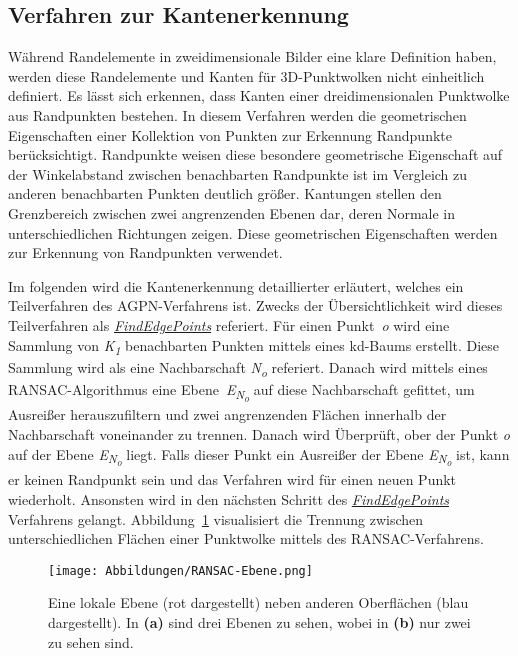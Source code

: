 \subsection{Verfahren zur Kantenerkennung} \label{edge_detection_reprod}
Während Randelemente in zweidimensionale Bilder eine klare Definition haben, werden diese Randelemente und Kanten für 3D-Punktwolken nicht einheitlich definiert. Es lässt sich erkennen, dass Kanten einer dreidimensionalen Punktwolke aus Randpunkten bestehen. In diesem Verfahren werden die geometrischen Eigenschaften einer Kollektion von Punkten zur Erkennung Randpunkte berücksichtigt. Randpunkte weisen diese besondere geometrische Eigenschaft auf \textendash{} der Winkelabstand zwischen benachbarten Randpunkte ist im Vergleich zu anderen benachbarten Punkten deutlich größer. Kantungen stellen den Grenzbereich zwischen zwei angrenzenden Ebenen dar, deren Normale in unterschiedlichen Richtungen zeigen. Diese geometrischen Eigenschaften werden zur Erkennung von Randpunkten verwendet. \autocite[1-2]{ni_edge_2016}

Im folgenden wird die Kantenerkennung detaillierter erläutert, welches ein Teilverfahren des AGPN-Verfahrens ist. Zwecks der Übersichtlichkeit wird dieses Teilverfahren als \textit{\hyperref[alg:find_edge_points]{FindEdgePoints}} referiert. Für einen Punkt~\textit{o} wird eine Sammlung von \textit{K\textsubscript{1}} benachbarten Punkten mittels eines kd-Baums erstellt. Diese Sammlung wird als eine Nachbarschaft \textit{N\textsubscript{o}} referiert. Danach wird mittels eines RANSAC-Algorithmus eine Ebene~\textit{E\textsubscript{N\textsubscript{o}}} auf diese Nachbarschaft gefittet, um Ausreißer herauszufiltern und zwei angrenzenden Flächen innerhalb der Nachbarschaft voneinander zu trennen. Danach wird Überprüft, ober der Punkt \textit{o} auf der Ebene \textit{E\textsubscript{N\textsubscript{o}}} liegt. Falls dieser Punkt ein Ausreißer der Ebene \textit{E\textsubscript{N\textsubscript{o}}} ist, kann er keinen Randpunkt sein und das Verfahren wird für einen neuen Punkt wiederholt. Ansonsten wird in den nächsten Schritt des \textit{\hyperref[alg:find_edge_points]{FindEdgePoints}} Verfahrens gelangt. Abbildung~\ref{RANSAC-Ebene} visualisiert die Trennung zwischen unterschiedlichen Flächen einer Punktwolke mittels des RANSAC-Verfahrens. 

\begin{figure}[h]
	\texttt{[image: Abbildungen/RANSAC-Ebene.png]}
	\centering
	\caption[Trennung mehrerer Ebenen mit RANSAC]{Eine lokale Ebene (rot dargestellt) neben anderen Oberflächen (blau dargestellt). In \textbf{(a)} sind drei Ebenen zu sehen, wobei in \textbf{(b)} nur zwei zu sehen sind. \autocite{ni_edge_2016}}
	\label{RANSAC-Ebene}
\end{figure} 

